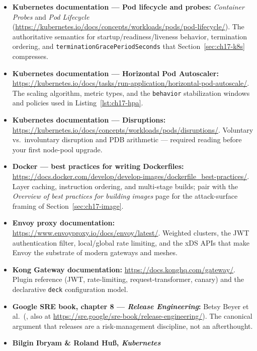 \begin{itemize}
  \item \textbf{Kubernetes documentation --- Pod lifecycle and probes:}
        \emph{Container Probes} and \emph{Pod Lifecycle}
        (\url{https://kubernetes.io/docs/concepts/workloads/pods/pod-lifecycle/}).
        The authoritative semantics for startup/readiness/liveness
        behavior, termination ordering, and
        \texttt{terminationGracePeriodSeconds} that
        Section~\ref{sec:ch17-k8s} compresses.
  \item \textbf{Kubernetes documentation --- Horizontal Pod Autoscaler:}
        \url{https://kubernetes.io/docs/tasks/run-application/horizontal-pod-autoscale/}.
        The scaling algorithm, metric types, and the \texttt{behavior}
        stabilization windows and policies used in
        Listing~\ref{lst:ch17-hpa}.
  \item \textbf{Kubernetes documentation --- Disruptions:}
        \url{https://kubernetes.io/docs/concepts/workloads/pods/disruptions/}.
        Voluntary vs.\ involuntary disruption and PDB arithmetic ---
        required reading before your first node-pool upgrade.
  \item \textbf{Docker --- best practices for writing Dockerfiles:}
        \url{https://docs.docker.com/develop/develop-images/dockerfile_best-practices/}.
        Layer caching, instruction ordering, and multi-stage builds;
        pair with the \emph{Overview of best practices for building
        images} page for the attack-surface framing of
        Section~\ref{sec:ch17-image}.
  \item \textbf{Envoy proxy documentation:}
        \url{https://www.envoyproxy.io/docs/envoy/latest/}. Weighted
        clusters, the JWT authentication filter, local/global rate
        limiting, and the xDS APIs that make Envoy the substrate of
        modern gateways and meshes.
  \item \textbf{Kong Gateway documentation:}
        \url{https://docs.konghq.com/gateway/}. Plugin reference (JWT,
        rate-limiting, request-transformer, canary) and the declarative
        \texttt{deck} configuration model.
  \item \textbf{Google SRE book, chapter 8 --- \emph{Release
        Engineering}:} Betsy Beyer et al.\ (\cite{beyer2016sre}, also at
        \url{https://sre.google/sre-book/release-engineering/}). The
        canonical argument that releases are a risk-management
        discipline, not an afterthought.
  \item \textbf{Bilgin Ibryam \& Roland Hu\ss, \emph{Kubernetes
}}
\end{itemize}

